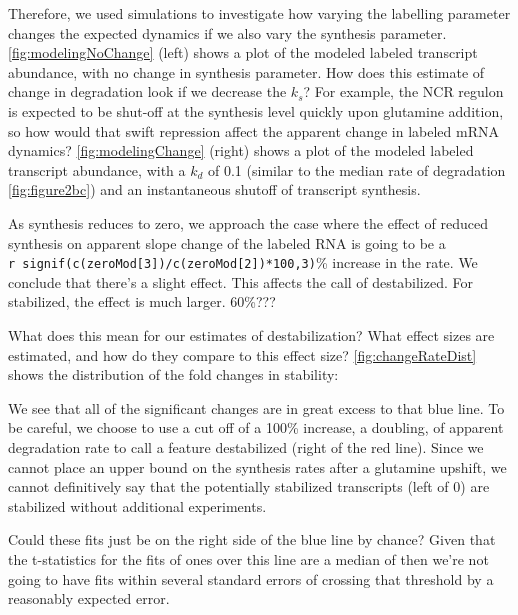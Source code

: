 {Therefore, we used simulations to investigate how varying the labelling
parameter changes the expected dynamics if we also vary the synthesis
parameter. \autoref{fig:modelingNoChange} (left) shows a plot of the modeled
labeled transcript abundance, with no change in synthesis parameter.
How does this estimate of change in degradation look if we decrease the
\(k_s\)? For example, the NCR regulon is expected to be shut-off at the
synthesis level quickly upon glutamine addition, so how would that swift
repression affect the apparent change in labeled mRNA dynamics?
\autoref{fig:modelingChange} (right) shows a plot of the modeled
labeled transcript abundance, with a $k_d$ of 0.1 (similar to the
median rate of degradation \autoref{fig:figure2bc}) 
and an instantaneous shutoff of transcript synthesis.


As synthesis reduces to zero, we approach the case where the effect of
reduced synthesis on apparent slope change of the labeled RNA is going
to be a \texttt{r\ signif(c(zeroMod{[}3{]})/c(zeroMod{[}2{]})*100,3)}\%
increase in the rate.
We conclude that there's a slight effect.
This affects the call of destabilized.
For stabilized, the effect is much larger. 60\%???

What does this mean for our estimates of destabilization? What effect
sizes are estimated, and how do they compare to this effect size?
\autoref{fig:changeRateDist} shows the distribution of the fold changes in
stability:


We see that all of the significant changes are in great excess to that
blue line. To be careful, we choose to use a cut off of a 100\%
increase, a doubling, of apparent degradation rate to call a feature
destabilized (right of the red line). Since we cannot place an upper
bound on the synthesis rates after a glutamine upshift, we cannot
definitively say that the potentially stabilized transcripts (left of 0)
are stabilized without additional experiments.

Could these fits just be on the right side of the blue line by chance?
Given that the t-statistics for the fits of ones over this line are a
median of
then we're not going to have fits within several standard errors of
crossing that threshold by a reasonably expected error.

}
